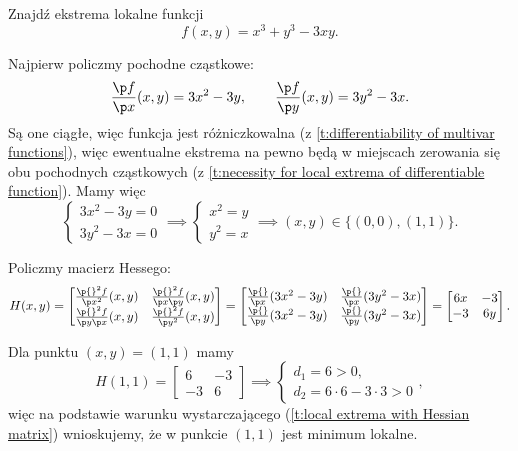\begin{example}
    Znajdź ekstrema lokalne funkcji
    \[ f(x, y) = x^3 + y^3 - 3xy. \]
\end{example}
\begin{solution}
    Najpierw policzmy pochodne cząstkowe:
    \[ \frac{\p f}{\p x}(x, y) = 3x^2 - 3y, \qquad \frac{\p f}{\p y}(x, y) = 3y^2 - 3x.\]
    Są one ciągłe, więc funkcja jest różniczkowalna (z \ref{t:differentiability of multivar functions}), więc ewentualne ekstrema na pewno będą w miejscach zerowania się obu pochodnych cząstkowych (z \ref{t:necessity for local extrema of differentiable function}). Mamy więc
    \[ \begin{cases} 3x^2 - 3y = 0 \\ 3y^2 - 3x = 0 \end{cases} \implies \begin{cases} x^2 = y \\ y^2 = x \end{cases} \implies (x, y) \in \{(0, 0), (1, 1)\}. \]

    Policzmy macierz Hessego:
    \[ H(x, y) = \begin{bmatrix}
        \frac{\p{}^2 f}{\p x^2}(x, y) & \frac{\p{}^2 f}{\p x \p y}(x, y) \\
        \frac{\p{}^2 f}{\p y \p x}(x, y) & \frac{\p{}^2 f}{\p y^2}(x, y)
    \end{bmatrix} = \begin{bmatrix}
        \frac{\p{} }{\p x}(3x^2 - 3y) & \frac{\p{} }{\p x}(3y^2 - 3x) \\
        \frac{\p{} }{\p y}(3x^2 - 3y) & \frac{\p{} }{\p y}(3y^2 - 3x)
    \end{bmatrix} = \begin{bmatrix}
        6x & -3 \\
        -3 & 6y
    \end{bmatrix}. \]

    Dla punktu $(x, y) = (1, 1)$ mamy
    \[ H(1, 1) = \begin{bmatrix}
        6 & -3 \\
        -3 & 6
    \end{bmatrix} \implies \begin{cases} d_1 = 6 > 0,\\ d_2 = 6\cdot 6 - 3\cdot 3 > 0 \end{cases}, \]
    więc na podstawie warunku wystarczającego (\ref{t:local extrema with Hessian matrix}) wnioskujemy, że w punkcie $(1, 1)$ jest minimum lokalne.


\end{solution}
